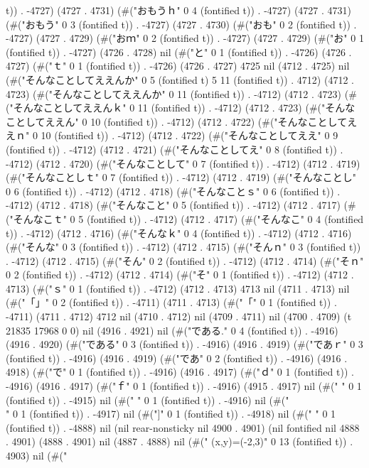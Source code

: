 t)) . -4727) (4727 . 4731) (#("おもうｈ" 0 4 (fontified t)) . -4727) (4727 . 4731) (#("おもう" 0 3 (fontified t)) . -4727) (4727 . 4730) (#("おも" 0 2 (fontified t)) . -4727) (4727 . 4729) (#("おｍ" 0 2 (fontified t)) . -4727) (4727 . 4729) (#("お" 0 1 (fontified t)) . -4727) (4726 . 4728) nil (#("と" 0 1 (fontified t)) . -4726) (4726 . 4727) (#("ｔ" 0 1 (fontified t)) . -4726) (4726 . 4727) 4725 nil (4712 . 4725) nil (#("そんなことしてええんか" 0 5 (fontified t) 5 11 (fontified t)) . 4712) (4712 . 4723) (#("そんなことしてええんか" 0 11 (fontified t)) . -4712) (4712 . 4723) (#("そんなことしてええんｋ" 0 11 (fontified t)) . -4712) (4712 . 4723) (#("そんなことしてええん" 0 10 (fontified t)) . -4712) (4712 . 4722) (#("そんなことしてええｎ" 0 10 (fontified t)) . -4712) (4712 . 4722) (#("そんなことしてええ" 0 9 (fontified t)) . -4712) (4712 . 4721) (#("そんなことしてえ" 0 8 (fontified t)) . -4712) (4712 . 4720) (#("そんなことして" 0 7 (fontified t)) . -4712) (4712 . 4719) (#("そんなことしｔ" 0 7 (fontified t)) . -4712) (4712 . 4719) (#("そんなことし" 0 6 (fontified t)) . -4712) (4712 . 4718) (#("そんなことｓ" 0 6 (fontified t)) . -4712) (4712 . 4718) (#("そんなこと" 0 5 (fontified t)) . -4712) (4712 . 4717) (#("そんなこｔ" 0 5 (fontified t)) . -4712) (4712 . 4717) (#("そんなこ" 0 4 (fontified t)) . -4712) (4712 . 4716) (#("そんなｋ" 0 4 (fontified t)) . -4712) (4712 . 4716) (#("そんな" 0 3 (fontified t)) . -4712) (4712 . 4715) (#("そんｎ" 0 3 (fontified t)) . -4712) (4712 . 4715) (#("そん" 0 2 (fontified t)) . -4712) (4712 . 4714) (#("そｎ" 0 2 (fontified t)) . -4712) (4712 . 4714) (#("そ" 0 1 (fontified t)) . -4712) (4712 . 4713) (#("ｓ" 0 1 (fontified t)) . -4712) (4712 . 4713) 4713 nil (4711 . 4713) nil (#("「」" 0 2 (fontified t)) . -4711) (4711 . 4713) (#("「" 0 1 (fontified t)) . -4711) (4711 . 4712) 4712 nil (4710 . 4712) nil (4709 . 4711) nil (4700 . 4709) (t 21835 17968 0 0) nil (4916 . 4921) nil (#("である." 0 4 (fontified t)) . -4916) (4916 . 4920) (#("である" 0 3 (fontified t)) . -4916) (4916 . 4919) (#("であｒ" 0 3 (fontified t)) . -4916) (4916 . 4919) (#("であ" 0 2 (fontified t)) . -4916) (4916 . 4918) (#("で" 0 1 (fontified t)) . -4916) (4916 . 4917) (#("ｄ" 0 1 (fontified t)) . -4916) (4916 . 4917) (#("ｆ" 0 1 (fontified t)) . -4916) (4915 . 4917) nil (#("
" 0 1 (fontified t)) . -4915) nil (#("
" 0 1 (fontified t)) . -4916) nil (#("\\" 0 1 (fontified t)) . -4917) nil (#("]" 0 1 (fontified t)) . -4918) nil (#(" " 0 1 (fontified t)) . -4888) nil (nil rear-nonsticky nil 4900 . 4901) (nil fontified nil 4888 . 4901) (4888 . 4901) nil (4887 . 4888) nil (#(" (x,y)=(-2,3)" 0 13 (fontified t)) . 4903) nil (#("
